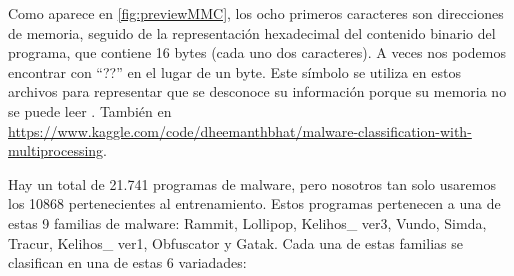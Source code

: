 Como aparece en \ref{fig:previewMMC}, los ocho primeros caracteres son direcciones de memoria, seguido de la representación hexadecimal del contenido binario del programa, que contiene 16 bytes (cada uno dos caracteres). A veces nos podemos encontrar con ``??'' en el lugar de un byte. Este símbolo se utiliza en estos archivos para representar que se desconoce su información porque su memoria no se puede leer \citep{cahyani2022influence}. También en \url{https://www.kaggle.com/code/dheemanthbhat/malware-classification-with-multiprocessing}.



Hay un total de 21.741 programas de malware, pero nosotros tan solo usaremos los 10868 pertenecientes al entrenamiento. Estos programas pertenecen a una de estas 9 familias de malware: Rammit, Lollipop, Kelihos\_ ver3, Vundo, Simda, Tracur, Kelihos\_ ver1, Obfuscator y Gatak. Cada una de estas familias se clasifican en una de estas 6 variadades:
